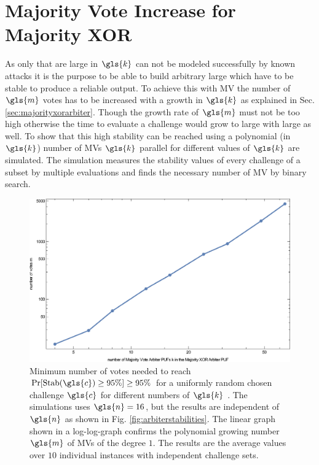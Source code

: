 
\section{Majority Vote Increase for Majority \acs{XOR} \apufs}
\label{sec:majorityvotegrowth}

As only \xpufs that are large in $\gls{k}$ can not be modeled successfully by known attacks it is the purpose to be able to build arbitrary large \xpufs which have to be stable to produce a reliable output.
To achieve this with \ac{MV} the number of $\gls{m}$ votes has to be increased with a growth in $\gls{k}$ as explained in Sec. \ref{sec:majorityxorarbiter}.
Though the growth rate of $\gls{m}$ must not be too high otherwise the time to evaluate a challenge would grow to large with large \xpufs as well. %
To show that this high stability can be reached using a polynomial (in $\gls{k}$) number of \acp{MV} $\gls{k}$ parallel \mpufs for different values of $\gls{k}$ are simulated.
The simulation measures the stability values of every challenge of a subset by multiple evaluations and finds the necessary number of \ac{MV} by binary search.


\begin{figure}[ht]
\includegraphics[width=1.00\textwidth]{images/votes-stab-simulation.eps}
\caption[Minimum number of votes need for large \mxpuf]{Minimum number of votes needed to reach $\Pr[\protect\Stab(\gls{c}) \ge 95 \%] \ge 95 \%$ for a uniformly random chosen challenge $\gls{c}$ for different numbers of $\gls{k}$ \apufs. 
The simulations uses $\gls{n} = 16$, but the results are independent of $\gls{n}$ as shown in Fig. \ref{fig:arbiterstabilities}. 
The linear graph shown in a log-log-graph confirms the polynomial growing number $\gls{m}$ of \acp{MV} of the degree $1$.
The results are the average values over $10$ individual \puf instances with independent challenge sets.} 
\label{fig:majorityvotegrowth}
\end{figure}

